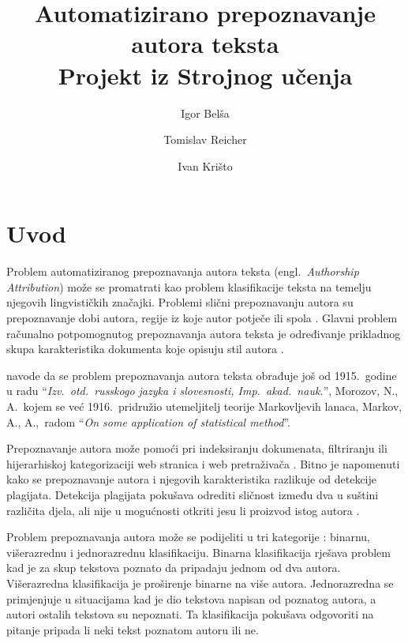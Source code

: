 \documentclass{article}
\newcommand{\engl}[1]{(engl.~\emph{#1})}
\begin{document}
\title{Automatizirano prepoznavanje autora teksta\\Projekt iz Strojnog učenja}
\author{Igor Belša \and Tomislav Reicher \and Ivan Krišto}

\maketitle

\thispagestyle{empty}

\tableofcontents

\newpage

\section{Uvod}
Problem automatiziranog prepoznavanja autora teksta \engl{Authorship Attribution}
može se promatrati kao problem klasifikacije teksta na temelju njegovih
lingvističkih značajki. Problemi slični prepoznavanju autora su prepoznavanje
dobi autora, regije iz koje autor potječe ili spola \citep{luyckx2005shallow}.
Glavni problem računalno potpomognutog prepoznavanja autora teksta je određivanje
prikladnog skupa karakteristika dokumenta koje opisuju stil autora
\citep{coyotl2006authorship}.

\citet{kukushkina2001using} navode da se problem prepoznavanja autora teksta
obrađuje još od 1915.~godine u radu ``\emph{Izv.~otd.~russkogo jazyka i
slovesnosti, Imp.~akad.~nauk.}'', Morozov, N., A.~kojem se već 1916.~pridružio
utemeljitelj teorije Markovljevih lanaca, Markov, A., A.,~radom ``\emph{On some
application of statistical method}''.

Prepoznavanje autora može pomoći pri indeksiranju dokumenata, filtriranju ili
hijerarhiskoj kategorizaciji web stranica i web pretraživača
\citep{luyckx2005shallow}. Bitno je napomenuti kako se prepoznavanje autora i
njegovih karakteristika razlikuje od detekcije plagijata. Detekcija
plagijata pokušava odrediti sličnost između dva u suštini različita
djela, ali nije u mogućnosti otkriti jesu li proizvod istog autora
\citep{de2001mining}.

Problem prepoznavanja autora može se podijeliti u tri kategorije
\citep{zhao2005effective}: binarnu, višerazrednu i jednorazrednu klasifikaciju.
Binarna klasifikacija rješava problem kad je za skup tekstova poznato da
pripadaju jednom od dva autora. Višerazredna klasifikacija je proširenje
binarne na više autora. Jednorazredna se primjenjuje u situacijama kad je
dio tekstova napisan od poznatog autora, a autori ostalih tekstova su
nepoznati. Ta klasifikacija pokušava odgovoriti na pitanje pripada li neki
tekst poznatom autoru ili ne.
\end{document}
